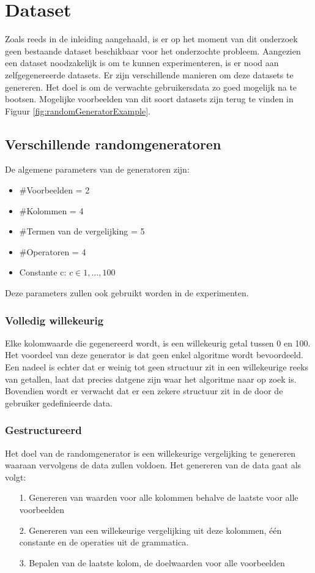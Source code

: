 \documentclass[Main.tex]{subfiles}
\begin{document}
\section{Dataset}

Zoals reeds in de inleiding aangehaald, is er op het moment van dit onderzoek geen bestaande dataset beschikbaar voor het onderzochte probleem. Aangezien een dataset noodzakelijk is om te kunnen experimenteren, is er nood aan zelfgegenereerde datasets. Er zijn verschillende manieren om deze datasets te genereren. Het doel is om de verwachte gebruikersdata zo goed mogelijk na te bootsen. Mogelijke voorbeelden van dit soort datasets zijn terug te vinden in Figuur \ref{fig:randomGeneratorExample}.
  
\subsection{Verschillende randomgeneratoren}
De algemene parameters van de generatoren zijn:
\begin{itemize}
\item $\#$Voorbeelden = 2
\item $\#$Kolommen = 4
\item $\#$Termen van de vergelijking = 5
\item $\#$Operatoren = 4
\item Constante c: $ c \in 1,\dotsc,100$ 
\end{itemize}
Deze parameters zullen ook gebruikt worden in de experimenten.

\subsubsection*{Volledig willekeurig}
Elke kolomwaarde die gegenereerd wordt, is een willekeurig getal tussen 0 en 100. Het voordeel van deze generator is dat geen enkel algoritme wordt bevoordeeld. Een nadeel is echter dat er weinig tot geen structuur zit in een willekeurige reeks van getallen, laat dat precies datgene zijn waar het algoritme naar op zoek is. Bovendien wordt er verwacht dat er een zekere structuur zit in de door de gebruiker gedefinieerde data.

\subsubsection*{Gestructureerd}
Het doel van de randomgenerator is een willekeurige vergelijking te genereren waaraan vervolgens de data zullen voldoen.
Het genereren van de data gaat als volgt:
\begin{itemize}
\item[1.] Genereren van waarden voor alle kolommen behalve de laatste voor alle voorbeelden
\item[2.] Genereren van een willekeurige vergelijking uit deze kolommen, \'e\'en constante en de operaties uit de grammatica.
\item[3.] Bepalen van de laatste kolom, de doelwaarden voor alle voorbeelden
\end{itemize}
\end{document}

